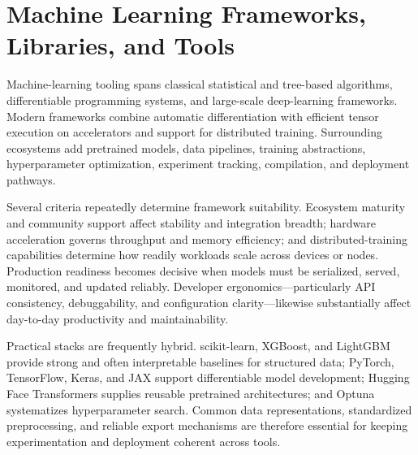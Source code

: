 \documentclass{article}
\begin{document}
\clearpage




\section{Machine Learning Frameworks, Libraries, and Tools}

Machine-learning tooling spans classical statistical and tree-based algorithms, differentiable programming systems, and large-scale deep-learning frameworks. Modern frameworks combine automatic differentiation with efficient tensor execution on accelerators and support for distributed training. Surrounding ecosystems add pretrained models, data pipelines, training abstractions, hyperparameter optimization, experiment tracking, compilation, and deployment pathways.

Several criteria repeatedly determine framework suitability. Ecosystem maturity and community support affect stability and integration breadth; hardware acceleration governs throughput and memory efficiency; and distributed-training capabilities determine how readily workloads scale across devices or nodes. Production readiness becomes decisive when models must be serialized, served, monitored, and updated reliably. Developer ergonomics---particularly API consistency, debuggability, and configuration clarity---likewise substantially affect day-to-day productivity and maintainability.

Practical stacks are frequently hybrid. scikit-learn, XGBoost, and LightGBM provide strong and often interpretable baselines for structured data; PyTorch, TensorFlow, Keras, and JAX support differentiable model development; Hugging Face Transformers supplies reusable pretrained architectures; and Optuna systematizes hyperparameter search. Common data representations, standardized preprocessing, and reliable export mechanisms are therefore essential for keeping experimentation and deployment coherent across tools.




\clearpage
\end{document}
